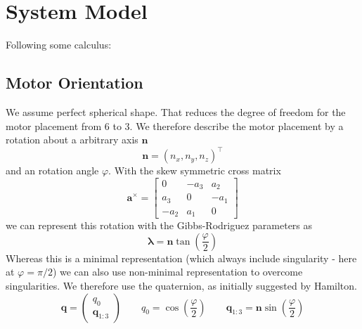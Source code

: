 \chapter{System Model}
\label{chap:sysmod}

Following some calculus:

\section{Motor Orientation}
We assume perfect spherical shape. That reduces the degree of freedom for the motor placement from 6 to 3. We therefore describe the motor placement by a rotation about a arbitrary axis $\mathbf{n}$
\begin{equation}
\mathbf{n} = \left(n_x, n_y, n_z\right)^\top
\end{equation}
and an rotation angle $\varphi$.
With the skew symmetric cross matrix
\begin{equation}
\textbf{a}^\times = \left[
\begin{array}{ccc}
0 & -a_3 & a_2 \\
a_3 & 0 & -a_1 \\
-a_2 & a_1 & 0
\end{array} \right]
\end{equation}
we can represent this rotation with the Gibbs-Rodriguez parameters as
\begin{equation}
\boldsymbol{\lambda} = \mathbf{n}\tan{\left(\frac{\varphi}{2}\right)}
\end{equation}
Whereas this is a minimal representation (which always include singularity - here at $\varphi=\pi / 2$) we can also use non-minimal representation to overcome singularities. We therefore use the quaternion, as initially suggested by Hamilton.
\begin{equation}
\mathbf{q} = \left( \begin{array}{c} 
q_0 \\ \mathbf{q}_{1:3} 
\end{array} \right) \qquad
q_0 = \cos\left(\frac{\varphi}{2}\right) \qquad
\mathbf{q}_{1:3} = \mathbf{n}\sin\left(\frac{\varphi}{2}\right)
\end{equation}

